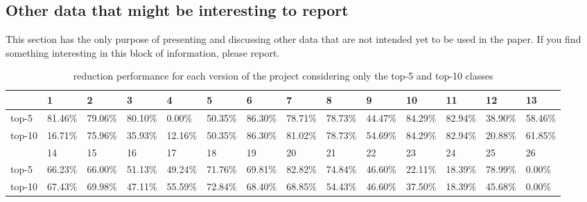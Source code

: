 \documentclass{article}
\begin{document}
\begin{appendices}
	\section{Other data that might be interesting to report}
	This section has the only purpose of presenting and discussing other data that 
	are not intended yet to be used in the paper. If you find something interesting 
	in this block of information, please report.
	
	\begin{table}[h]
		\setlength{\tabcolsep}{3pt}
		\begin{tabular}{llllllllllllll}
			\toprule
			   & 1       & 2       & 3       & 4       & 5       & 6       & 7       & 8       & 9       & 10      & 11      & 12      & 13      \\\midrule
		top-5  & 81.46\% & 79.06\% & 80.10\% & 0.00\%  & 50.35\% & 86.30\% & 78.71\% & 78.73\% & 44.47\% & 84.29\% & 82.94\% & 38.90\% & 58.46\% \\
		top-10 & 16.71\% & 75.96\% & 35.93\% & 12.16\% & 50.35\% & 86.30\% & 81.02\% & 78.73\% & 54.69\% & 84.29\% & 82.94\% & 20.88\% & 61.85\% \\\midrule
			   & 14      & 15      & 16      & 17      & 18      & 19      & 20      & 21      & 22      & 23      & 24      & 25      & 26      \\\midrule
		top-5  & 66.23\% & 66.00\% & 51.13\% & 49.24\% & 71.76\% & 69.81\% & 82.82\% & 74.84\% & 46.60\% & 22.11\% & 18.39\% & 78.99\% & 0.00\%  \\
		top-10 & 67.43\% & 69.98\% & 47.11\% & 55.59\% & 72.84\% & 68.40\% & 68.85\% & 54.43\% & 46.60\% & 37.50\% & 18.39\% & 45.68\% & 0.00\%  \\
			\bottomrule
		\end{tabular}
		\caption {\ds{} reduction performance for each version of the \chart{} project considering only the top-5 and top-10 classes}
		\label{table:reduction}
	\end{table}
	

\end{appendices}
\end{document}

